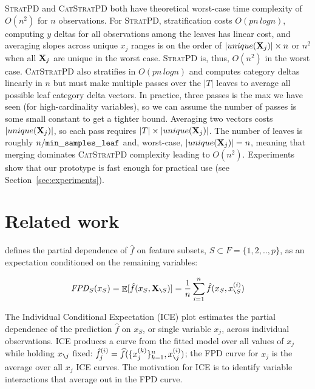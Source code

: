 \documentclass[smallextended]{svjour3}       %
\newcommand{\secref}[1]{Section~\ref{#1}}
\newcommand{\cut}[1]{}
\newcommand{\spd}{\fontfamily{cmr}\textsc{\small StratPD}}
\newcommand{\cspd}{\fontfamily{cmr}\textsc{\small CatStratPD}}
\newcommand{\xnj}{$x_{\texttt{\char`\\} j}$}
\renewcommand{\slash}{\texttt{\char`\\}}
\DeclareMathOperator{\Ex}{\mathbb{E}}
\begin{document}
\spd{} and \cspd{} both have theoretical worst-case time complexity of $O(n^2)$ for $n$ observations. For \spd{}, stratification costs $O(p n \,log n)$, computing $y$ deltas for all observations among the leaves has linear cost, and averaging slopes across unique $x_j$ ranges is on the order of $|unique({\bf X}_j)| \times n$ or $n^2$ when all ${\bf X}_j$ are unique in the worst case. \spd{} is, thus, $O(n^2)$ in the worst case.  \cspd{} also stratifies in $O(p n \,log n)$ and computes category deltas linearly in $n$ but must make multiple passes over the $|T|$ leaves to average all possible leaf category delta vectors.  In practice, three passes is the max we have seen (for high-cardinality variables), so we can assume the number of passes is some small constant to get a tighter bound. Averaging two vectors costs $|unique({\bf X}_j)|$, so each pass requires $|T| \times |unique({\bf X}_j)|$. The number of leaves is roughly $n / {\tt\small min\_samples\_leaf}$ and, worst-case, $|unique({\bf X}_j)|=n$, meaning that merging dominates \cspd{} complexity leading to $O(n^2)$.  Experiments show that our prototype is fast enough for practical use (see \secref{sec:experiments}).

\section{Related work}\label{sec:related}

\citet{PDP} defines the partial dependence of $\hat{f}$ on feature subsets, $S \subset F = \{1, 2, .., p\}$, as an expectation conditioned on the remaining variables:\vspace{-2mm}

\begin{equation}
{\it FPD}_S(x_S) = \Ex[\hat{f}(x_S,{\bf X}_{\slash S})] = \frac{1}{n} \sum_{i=1}^n \hat{f}(x_S, x_{\slash S}^{(i)})
\end{equation}\vspace{-2mm}

\cut{
\[
{\it FPD}_j(x_j=z) = \Ex[\hat{f}(x_{j}=z,{\bf X}_{\slash j})] = \frac{1}{n} \sum_{i=1}^n \hat{f}(x_j=z, x_{\slash j}^{(i)})
\]
}

\cut{
\noindent FPD replaces ${\bf X}_j$ with $z$ then computes the average model output for the altered $x^{(i)}$.
}


The Individual Conditional Expectation (ICE) plot \citep{ICE} estimates the partial dependence of the prediction $\hat{f}$ on $x_S$, or single variable $x_j$, across individual observations. ICE produces a curve from the fitted model over all values of $x_j$ while holding \xnj{} fixed: $\hat{f}^{(i)}_j = \widehat{f}(\{x_j^{(k)}\}_{k = 1}^n, x_{\slash j}^{(i)})$;  the FPD curve for  $x_j$ is the average over all $x_j$ ICE curves. The motivation for ICE is to identify variable interactions that average out in the FPD curve. 
\end{document}
